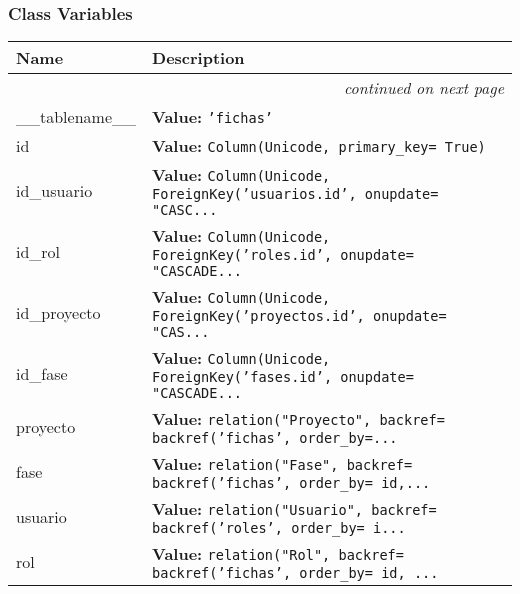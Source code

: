   \subsubsection{Class Variables}

    \vspace{-1cm}
\hspace{\varindent}\begin{longtable}{|p{\varnamewidth}|p{\vardescrwidth}|l}
\cline{1-2}
\cline{1-2} \centering \textbf{Name} & \centering \textbf{Description}& \\
\cline{1-2}
\endhead\cline{1-2}\multicolumn{3}{r}{\small\textit{continued on next page}}\\\endfoot\cline{1-2}
\endlastfoot\raggedright \_\-\_\-t\-a\-b\-l\-e\-n\-a\-m\-e\-\_\-\_\- & \raggedright \textbf{Value:} 
{\tt 'fichas'}&\\
\cline{1-2}
\raggedright i\-d\- & \raggedright \textbf{Value:} 
{\tt Column(Unicode, primary\_key= True)}&\\
\cline{1-2}
\raggedright i\-d\-\_\-u\-s\-u\-a\-r\-i\-o\- & \raggedright \textbf{Value:} 
{\tt Column(Unicode, ForeignKey('usuarios.id', onupdate= "CASC\texttt{...}}&\\
\cline{1-2}
\raggedright i\-d\-\_\-r\-o\-l\- & \raggedright \textbf{Value:} 
{\tt Column(Unicode, ForeignKey('roles.id', onupdate= "CASCADE\texttt{...}}&\\
\cline{1-2}
\raggedright i\-d\-\_\-p\-r\-o\-y\-e\-c\-t\-o\- & \raggedright \textbf{Value:} 
{\tt Column(Unicode, ForeignKey('proyectos.id', onupdate= "CAS\texttt{...}}&\\
\cline{1-2}
\raggedright i\-d\-\_\-f\-a\-s\-e\- & \raggedright \textbf{Value:} 
{\tt Column(Unicode, ForeignKey('fases.id', onupdate= "CASCADE\texttt{...}}&\\
\cline{1-2}
\raggedright p\-r\-o\-y\-e\-c\-t\-o\- & \raggedright \textbf{Value:} 
{\tt relation("Proyecto", backref= backref('fichas', order\_by=\texttt{...}}&\\
\cline{1-2}
\raggedright f\-a\-s\-e\- & \raggedright \textbf{Value:} 
{\tt relation("Fase", backref= backref('fichas', order\_by= id,\texttt{...}}&\\
\cline{1-2}
\raggedright u\-s\-u\-a\-r\-i\-o\- & \raggedright \textbf{Value:} 
{\tt relation("Usuario", backref= backref('roles', order\_by= i\texttt{...}}&\\
\cline{1-2}
\raggedright r\-o\-l\- & \raggedright \textbf{Value:} 
{\tt relation("Rol", backref= backref('fichas', order\_by= id, \texttt{...}}&\\
\cline{1-2}
\end{longtable}

